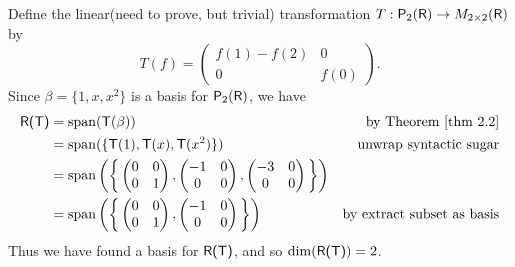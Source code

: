 \begin{example} \label{example 2.1.10}
Define the linear(need to prove, but trivial) transformation \(T : \textsf{P}_2(\textsf{R}) \to M_{2 \times 2}(\textsf{R})\) by
\[
    T(f) = \begin{pmatrix}
        f(1) - f(2) &    0 \\
        0           & f(0)
    \end{pmatrix}.
\]
Since \(\beta = \{1, x, x^2\}\) is a basis for \(\textsf{P}_2(\textsf{R})\), we have
\begin{align*}
    \RANGET & = \spann(\T(\beta)) & \text{by \THM{2.2}} \\
            & = \spann(\{\T(1), \T(x), \T(x^2)\}) & \text{unwrap syntactic sugar} \\
            & = \spann\bigg(\bigg\{
                    \begin{pmatrix}
                        0 & 0 \\
                        0 & 1
                    \end{pmatrix},
                    \begin{pmatrix}
                        -1 & 0 \\
                        0  & 0
                    \end{pmatrix},
                    \begin{pmatrix}
                        -3 & 0 \\
                        0  & 0
                    \end{pmatrix}
                \bigg\}\bigg) \\
            & = \spann\bigg(\bigg\{
                    \begin{pmatrix}
                        0 & 0 \\
                        0 & 1
                    \end{pmatrix},
                    \begin{pmatrix}
                        -1 & 0 \\
                        0  & 0
                    \end{pmatrix}
                \bigg\}\bigg) & \text{by extract subset as basis}
\end{align*}
Thus we have found a basis for \(\textsf{R(T)}\), and so \(\dim(\textsf{R(T)}) = 2\).


\end{example}
